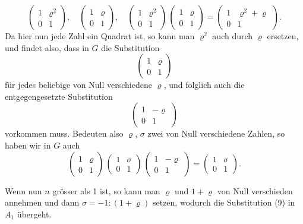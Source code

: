 \documentclass[12pt,a4paper]{article}
\begin{document}
\[
\begin{pmatrix}1&\varrho^{2}\\0&1\end{pmatrix},\quad
\begin{pmatrix}1&\varrho\\0&1\end{pmatrix},\quad
\begin{pmatrix}1&\varrho^{2}\\0&1\end{pmatrix}\,
\begin{pmatrix}1&\varrho\\0&1\end{pmatrix}
= \begin{pmatrix}1&\varrho^{2} + \varrho\\0&1\end{pmatrix}.
\]
Da hier nun jede Zahl ein Quadrat ist, so kann man $\varrho^{2}$ auch durch $\varrho$ ersetzen, und findet also, dass in $G$ die Substitution
\[
\begin{pmatrix}1&\varrho\\0&1\end{pmatrix}
\]
für jedes beliebige von Null verschiedene $\varrho$, und folglich auch die entgegengesetzte Substitution
\[
\begin{pmatrix}1&-\varrho\\0&1\end{pmatrix}
\]
vorkommen muss. Bedeuten also $\varrho$, $\sigma$ zwei von Null verschiedene Zahlen, so haben wir in $G$ auch
\[
\begin{pmatrix}1&\varrho\\0&1\end{pmatrix}\,
\begin{pmatrix}1&\sigma\\0&1\end{pmatrix}\,
\begin{pmatrix}1&-\varrho\\0&1\end{pmatrix}
= \begin{pmatrix}1&\sigma\\0&1\end{pmatrix}.
\]

\newpage
{}

Wenn nun $n$ grösser als 1 ist, so kann man $\varrho$ und $1 + \varrho$ von Null verschieden annehmen und dann $\sigma = -1 : (1 + \varrho)$ setzen, wodurch die Substitution (9) in $A_{1}$ übergeht.
\end{document}
